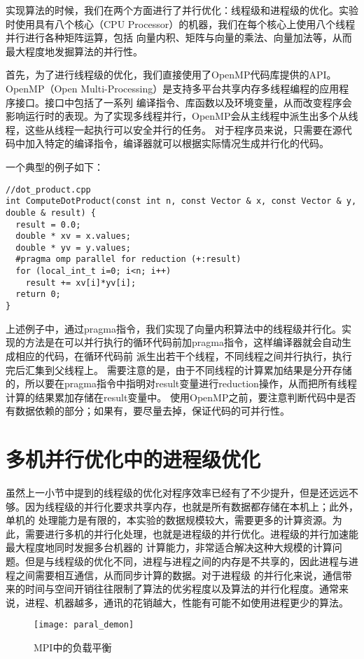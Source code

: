 实现算法的时候，我们在两个方面进行了并行优化：线程级和进程级的优化。实验时使用具有八个核心（CPU Processor）的机器，我们在每个核心上使用八个线程并行进行各种矩阵运算，包括
向量内积、矩阵与向量的乘法、向量加法等，从而最大程度地发掘算法的并行性。

首先，为了进行线程级的优化，我们直接使用了OpenMP代码库提供的API。OpenMP（Open Multi-Processing）是支持多平台共享内存多线程编程的应用程序接口。接口中包括了一系列
编译指令、库函数以及环境变量，从而改变程序会影响运行时的表现。为了实现多线程并行，OpenMP会从主线程中派生出多个从线程，这些从线程一起执行可以安全并行的任务。
对于程序员来说，只需要在源代码中加入特定的编译指令，编译器就可以根据实际情况生成并行化的代码。

一个典型的例子如下：
\begin{lstlisting}
//dot_product.cpp
int ComputeDotProduct(const int n, const Vector & x, const Vector & y, double & result) {
  result = 0.0;
  double * xv = x.values;
  double * yv = y.values;
  #pragma omp parallel for reduction (+:result)
  for (local_int_t i=0; i<n; i++)
    result += xv[i]*yv[i];
  return 0;
}
\end{lstlisting}

上述例子中，通过pragma指令，我们实现了向量内积算法中的线程级并行化。实现的方法是在可以并行执行的循环代码前加pragma指令，这样编译器就会自动生成相应的代码，在循环代码前
派生出若干个线程，不同线程之间并行执行，执行完后汇集到父线程上。
需要注意的是，由于不同线程的计算累加结果是分开存储的，所以要在pragma指令中指明对result变量进行reduction操作，从而把所有线程计算的结果累加存储在result变量中。
使用OpenMP之前，要注意判断代码中是否有数据依赖的部分；如果有，要尽量去掉，保证代码的可并行性。

\section{多机并行优化中的进程级优化}

虽然上一小节中提到的线程级的优化对程序效率已经有了不少提升，但是还远远不够。因为线程级的并行化要求共享内存，也就是所有数据都存储在本机上；此外，单机的
处理能力是有限的，本实验的数据规模较大，需要更多的计算资源。为此，需要进行多机的并行化处理，也就是进程级的并行优化。进程级的并行加速能最大程度地同时发掘多台机器的
计算能力，非常适合解决这种大规模的计算问题。但是与线程级的优化不同，进程与进程之间的内存是不共享的，因此进程与进程之间需要相互通信，从而同步计算的数据。对于进程级
的并行化来说，通信带来的时间与空间开销往往限制了算法的优劣程度以及算法的并行化程度。通常来说，进程、机器越多，通讯的花销越大，性能有可能不如使用进程更少的算法。
\begin{figure}[H]
  \centering
  \texttt{[image: paral\_demon]}
  \caption{MPI中的负载平衡}
  \label{fig:figparaldemon}
\end{figure}

